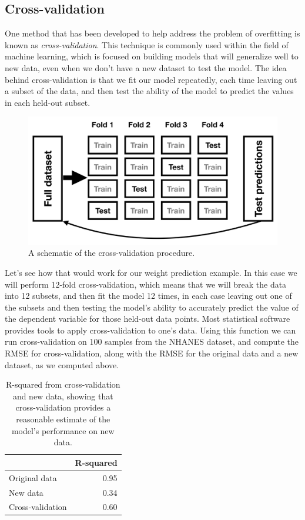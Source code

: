 \documentclass[12pt,]{book}
\theoremstyle{definition}
\theoremstyle{definition}
\theoremstyle{definition}
\theoremstyle{remark}
\begin{document}
\hypertarget{cross-validation}{%
\subsection{Cross-validation}\label{cross-validation}}

One method that has been developed to help address the problem of overfitting is known as \emph{cross-validation}. This technique is commonly used within the field of machine learning, which is focused on building models that will generalize well to new data, even when we don't have a new dataset to test the model. The idea behind cross-validation is that we fit our model repeatedly, each time leaving out a subset of the data, and then test the ability of the model to predict the values in each held-out subset.

\begin{figure}
\includegraphics[width=45.74in,height=0.3\textheight]{images/crossvalidation} \caption{A schematic of the  cross-validation procedure.}\label{fig:crossvalidation}
\end{figure}

Let's see how that would work for our weight prediction example. In this case we will perform 12-fold cross-validation, which means that we will break the data into 12 subsets, and then fit the model 12 times, in each case leaving out one of the subsets and then testing the model's ability to accurately predict the value of the dependent variable for those held-out data points. Most statistical software provides tools to apply cross-validation to one's data. Using this function we can run cross-validation on 100 samples from the NHANES dataset, and compute the RMSE for cross-validation, along with the RMSE for the original data and a new dataset, as we computed above.

\begin{table}

\caption{\label{tab:unnamed-chunk-88}R-squared from cross-validation and new data, showing that cross-validation provides a reasonable estimate of the model's performance on new data.}
\centering
\begin{tabular}[t]{l|r}
\hline
  & R-squared\\
\hline
Original data & 0.95\\
\hline
New data & 0.34\\
\hline
Cross-validation & 0.60\\
\hline
\end{tabular}
\end{table}
\end{document}
